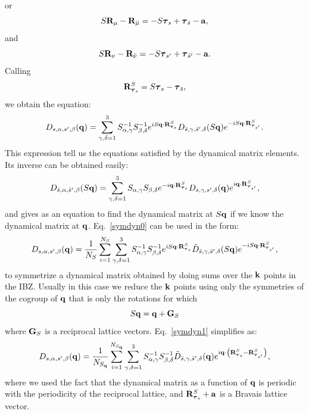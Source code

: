 \documentclass[12pt,a4paper,twoside]{report}
\begin{document}
or
\begin{equation}
S {\bf R}_\mu -  {\bf R}_{\bar \mu} = - S \boldsymbol{\tau}_s + \boldsymbol{\tau}_{\bar s} - {\bf a},
\end{equation}
and
\begin{equation}
S {\bf R}_\nu -  {\bf R}_{\bar \nu} = - S \boldsymbol{\tau}_{s'} + \boldsymbol{\tau}_{\bar s'} - {\bf a}.
\end{equation}
Calling
\begin{equation}
{\bf R}^{S}_{\boldsymbol{\tau}_s} = S \boldsymbol{\tau}_{s} - \boldsymbol{\tau}_{\bar s},
\label{rstaus}
\end{equation}
we obtain the equation:
\begin{equation}
D_{s,\alpha,s',\beta}({\bf q}) =
\sum_{\gamma,\delta=1}^3  S^{-1}_{\alpha,\gamma} S^{-1}_{\beta,\delta}
e^{i S {\bf q} \cdot {\bf R}^{S}_{\boldsymbol{\tau}_s} }
D_{\bar s,\gamma,\bar s',\delta}(S{\bf q})
e^{-i S{\bf q} \cdot {\bf R}^{S}_{\boldsymbol{\tau}_{s'}}}.
\label{symdyn0}
\end{equation}
This expression tell us the equations satisfied by the dynamical matrix elements.
Its inverse can be obtained easily:
\begin{equation}
D_{\bar s,\alpha,\bar s',\beta}(S{\bf q}) =
\sum_{\gamma,\delta=1}^3  S_{\alpha,\gamma} S_{\beta,\delta}
e^{-i {\bf q} \cdot {\bf R}^{S}_{\boldsymbol{\tau}_s} }
D_{s,\gamma,s',\delta}({\bf q})
e^{i {\bf q} \cdot {\bf R}^{S}_{\boldsymbol{\tau}_{s'}}},
\label{dynmat_inv}
\end{equation}
and gives as an equation to find the dynamical matrix at $S{\bf q}$ if we know the dynamical matrix at
${\bf q}$.
Eq.~\ref{symdyn0} can be used in the form:
\begin{equation}
D_{s,\alpha,s',\beta}({\bf q}) ={1\over N_S}
\sum_{i=1}^{N_S}
\sum_{\gamma,\delta=1}^3  S^{-1}_{\alpha,\gamma} S^{-1}_{\beta,\delta}
e^{i S {\bf q} \cdot {\bf R}^{S}_{\boldsymbol{\tau}_s} }
\tilde D_{\bar s,\gamma,\bar s',\delta}(S{\bf q})
e^{-i S{\bf q} \cdot {\bf R}^{S}_{\boldsymbol{\tau}_{s'}}},
\label{symdyn1}
\end{equation}
to symmetrize a dynamical matrix obtained by doing sums over the ${\bf k}$ points in the IBZ. Usually in this case we reduce the ${\bf k}$ points using only the symmetries of the cogroup of ${\bf q}$ that is only the rotations for which
\begin{equation}
S {\bf q} = {\bf q} + {\bf G}_S
\end{equation}
where ${\bf G}_S$ is a reciprocal lattice vectors.
Eq.~\ref{symdyn1} simplifies as:
\begin{equation}
D_{s,\alpha,s',\beta}({\bf q}) ={1\over N_{S_{\bf q}}}
\sum_{i=1}^{N_{S_{\bf q}}}
\sum_{\gamma,\delta=1}^3  S^{-1}_{\alpha,\gamma} S^{-1}_{\beta,\delta}
\tilde D_{\bar s,\gamma,\bar s',\delta}({\bf q})
e^{i {\bf q} \cdot \left( {\bf R}^{S}_{\boldsymbol{\tau}_s} - {\bf R}^{S}_{\boldsymbol{\tau}_{s'}} \right) },
\label{symdyn2}
\end{equation}
where we used the fact that the dynamical matrix as a function of ${\bf q}$ is periodic with the periodicity of the reciprocal lattice, and
${\bf R}^{S}_{\boldsymbol{\tau}_s}+{\bf a}$ is a
Bravais lattice vector.
\end{document}
